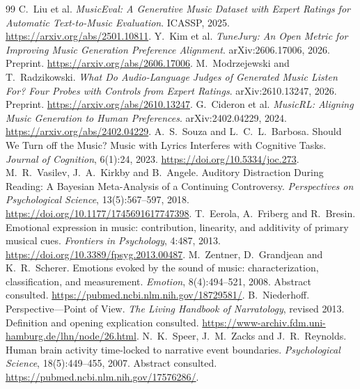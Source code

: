 \documentclass[11pt]{article}
\begin{document}
\begin{thebibliography}{99}
 C.~Liu et al. \emph{MusicEval: A Generative Music Dataset with Expert Ratings for Automatic Text-to-Music Evaluation}. ICASSP, 2025. \url{https://arxiv.org/abs/2501.10811}.
 Y.~Kim et al. \emph{TuneJury: An Open Metric for Improving Music Generation Preference Alignment}. arXiv:2606.17006, 2026. Preprint. \url{https://arxiv.org/abs/2606.17006}.
 M.~Modrzejewski and T.~Radzikowski. \emph{What Do Audio-Language Judges of Generated Music Listen For? Four Probes with Controls from Expert Ratings}. arXiv:2610.13247, 2026. Preprint. \url{https://arxiv.org/abs/2610.13247}.
 G.~Cideron et al. \emph{MusicRL: Aligning Music Generation to Human Preferences}. arXiv:2402.04229, 2024. \url{https://arxiv.org/abs/2402.04229}.
 A.~S.~Souza and L.~C.~L.~Barbosa. Should We Turn off the Music? Music with Lyrics Interferes with Cognitive Tasks. \emph{Journal of Cognition}, 6(1):24, 2023. \url{https://doi.org/10.5334/joc.273}.
 M.~R.~Vasilev, J.~A.~Kirkby and B.~Angele. Auditory Distraction During Reading: A Bayesian Meta-Analysis of a Continuing Controversy. \emph{Perspectives on Psychological Science}, 13(5):567--597, 2018. \url{https://doi.org/10.1177/1745691617747398}.
 T.~Eerola, A.~Friberg and R.~Bresin. Emotional expression in music: contribution, linearity, and additivity of primary musical cues. \emph{Frontiers in Psychology}, 4:487, 2013. \url{https://doi.org/10.3389/fpsyg.2013.00487}.
 M.~Zentner, D.~Grandjean and K.~R.~Scherer. Emotions evoked by the sound of music: characterization, classification, and measurement. \emph{Emotion}, 8(4):494--521, 2008. Abstract consulted. \url{https://pubmed.ncbi.nlm.nih.gov/18729581/}.
 B.~Niederhoff. Perspective---Point of View. \emph{The Living Handbook of Narratology}, revised 2013. Definition and opening explication consulted. \url{https://www-archiv.fdm.uni-hamburg.de/lhn/node/26.html}.
 N.~K.~Speer, J.~M.~Zacks and J.~R.~Reynolds. Human brain activity time-locked to narrative event boundaries. \emph{Psychological Science}, 18(5):449--455, 2007. Abstract consulted. \url{https://pubmed.ncbi.nlm.nih.gov/17576286/}.
\end{thebibliography}

\appendix
\end{document}

